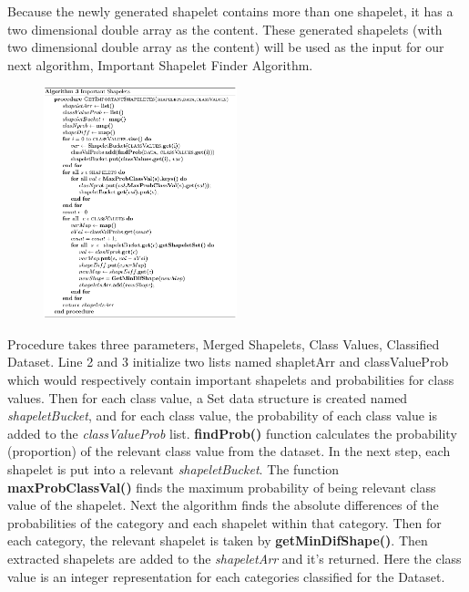 \documentclass[conference]{IEEEtran}  %
\begin{document}
Because the newly generated shapelet contains more than one shapelet, it has a two dimensional double array as the content. These generated shapelets (with two dimensional double array as the content) will be used as the input for our next algorithm, Important Shapelet Finder Algorithm. 


\begin{figure}[h!]
\includegraphics[width=0.5\textwidth]{algo3.png}
\end{figure}

Procedure takes three parameters, Merged Shapelets, Class Values, Classified Dataset. Line 2 and 3 initialize two lists named shapletArr and classValueProb which would respectively contain important shapelets and probabilities for class values. Then for each class value, a Set data structure is created named \textit{shapeletBucket}, and for each class value, the probability of each class value is added to the \textit{classValueProb} list. \textbf{findProb()} function calculates the probability (proportion) of the relevant class value from the dataset. In the next step, each shapelet is put into a relevant \textit{shapeletBucket}. The function \textbf{maxProbClassVal()} finds the maximum probability of being relevant class value of the shapelet. Next the algorithm finds the absolute differences of the probabilities of the category and each shapelet within that category. Then for each category, the relevant shapelet is taken by \textbf{getMinDifShape()}. Then extracted shapelets are added to the \textit{shapeletArr} and it’s returned. Here the class value is an integer representation for each categories classified for the Dataset.
\end{document}
